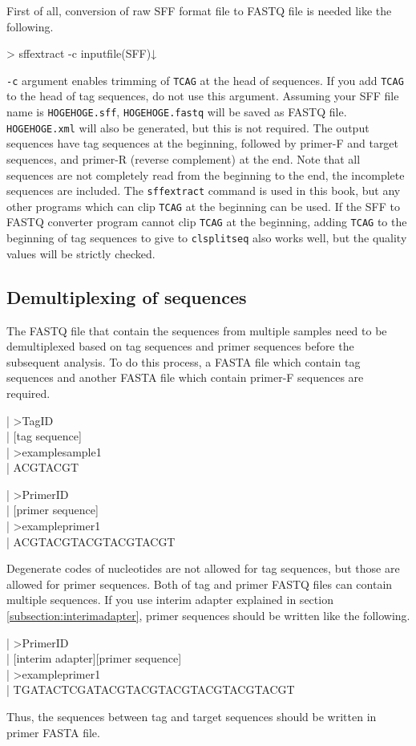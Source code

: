 \documentclass[titlepage,10pt,a4paper,english]{jsbook}
\newenvironment{content}{\begin{shaded}\vspace{-1em}\raggedright\ttfamily\footnotesize\setlength{\baselineskip}{1.4em}}{\end{shaded}\vspace{-1em}}
\newenvironment{cmd}{\begin{oframed}\raggedright\ttfamily\footnotesize\setlength{\baselineskip}{1.4em}}{\end{oframed}\vspace{-1em}}
\begin{document}
First of all, conversion of raw SFF format file to FASTQ file is needed like the following.
\begin{cmd}
{\textgreater} sff{\textunderscore}extract -c inputfile(SFF)↓
\end{cmd}
\texttt{-c} argument enables trimming of \texttt{TCAG} at the head of sequences.
If you add \texttt{TCAG} to the head of tag sequences, do not use this argument.
Assuming your SFF file name is \texttt{HOGEHOGE.sff}, \texttt{HOGEHOGE.fastq} will be saved as FASTQ file.
\texttt{HOGEHOGE.xml} will also be generated, but this is not required.
The output sequences have tag sequences at the beginning, followed by primer-F and target sequences, and primer-R (reverse complement) at the end.
Note that all sequences are not completely read from the beginning to the end, the incomplete sequences are included.
The \texttt{sff{\textunderscore}extract} command is used in this book, but any other programs which can clip \texttt{TCAG} at the beginning can be used.
If the SFF to FASTQ converter program cannot clip \texttt{TCAG} at the beginning, adding \texttt{TCAG} to the beginning of tag sequences to give to \texttt{clsplitseq} also works well, but the quality values will be strictly checked.

\subsection{Demultiplexing of sequences}

The FASTQ file that contain the sequences from multiple samples need to be demultiplexed based on tag sequences and primer sequences before the subsequent analysis.
To do this process, a FASTA file which contain tag sequences and another FASTA file which contain primer-F sequences are required.
\begin{content}
| {\textgreater}TagID\\
| [tag sequence]\\
| {\textgreater}examplesample1\\
| ACGTACGT
\end{content}
\begin{content}
| {\textgreater}PrimerID\\
| [primer sequence]\\
| {\textgreater}exampleprimer1\\
| ACGTACGTACGTACGTACGT
\end{content}
Degenerate codes of nucleotides are not allowed for tag sequences, but those are allowed for primer sequences.
Both of tag and primer FASTQ files can contain multiple sequences.
If you use interim adapter explained in section \ref{subsection:interimadapter}, primer sequences should be written like the following.
\begin{content}
| {\textgreater}PrimerID\\
| [interim adapter][primer sequence]\\
| {\textgreater}exampleprimer1\\
| TGATACTCGATACGTACGTACGTACGTACGTACGT
\end{content}
Thus, the sequences between tag and target sequences should be written in primer FASTA file.
\end{document}
